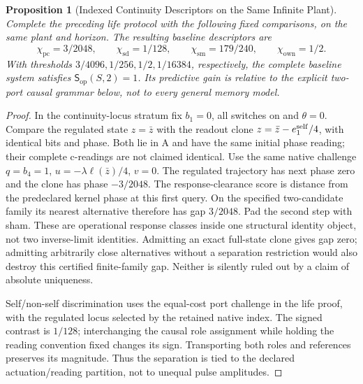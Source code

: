 \documentclass[11pt,a4paper]{article}
\newtheorem{proposition}{Proposition}[section]
\theoremstyle{definition}
\newcommand{\Subop}{\mathsf{S}_{\mathrm{op}}}
\newcommand{\Priv}{\chi_{\mathrm{pc}}}
\newcommand{\SelfDisc}{\chi_{\mathrm{sd}}}
\newcommand{\SelfModel}{\chi_{\mathrm{sm}}}
\newcommand{\Own}{\chi_{\mathrm{own}}}
\begin{document}
\begin{proposition}[Indexed Continuity Descriptors on the Same Infinite Plant]
\label{prop:asymmetric-native-subject}
Complete the preceding life protocol with the following fixed comparisons,
on the same plant and horizon. The resulting baseline descriptors are
\[
 \Priv=3/2048,\qquad \SelfDisc=1/128,\qquad
 \SelfModel=179/240,\qquad \Own=1/2.
\]
With thresholds $3/4096,1/256,1/2,1/16384$, respectively, the complete baseline
system satisfies $\Subop(S,2)=1$. Its predictive gain is relative to the
explicit two-port causal grammar below, not to every general memory model.
\end{proposition}
\begin{proof}
In the continuity-locus stratum fix $b_1=0$, all switches on and $\theta=0$.
Compare the regulated state $z=\bar z$ with the readout clone
$z=\bar z-e_1^{\rm self}/4$, with identical bits and phase. Both lie in A
and have the same initial phase reading; their complete c-readings are not
claimed identical. Use the same native challenge
$q=b_4=1$, $u=-\lambda\ell(\bar z)/4$, $v=0$.
The regulated trajectory has next phase zero and the clone has phase
$-3/2048$. The response-clearance score is distance from the predeclared
kernel phase at this first query. On the specified two-candidate family its
nearest alternative therefore has gap $3/2048$. Pad the second step with sham.
These are operational response classes inside one structural identity object,
not two inverse-limit identities. Admitting an exact full-state clone gives
gap zero; admitting arbitrarily close alternatives without a separation
restriction would also destroy this certified finite-family gap. Neither is
silently ruled out by a claim of absolute uniqueness.

Self/non-self discrimination uses the equal-cost port challenge in the life
proof, with the regulated locus selected by the retained native index. The
signed contrast is $1/128$; interchanging the causal role assignment while
holding the reading convention fixed changes its sign. Transporting both
roles and references preserves its magnitude. Thus the separation is tied to
the declared actuation/reading partition, not to unequal pulse amplitudes.


\end{proof}
\end{document}
